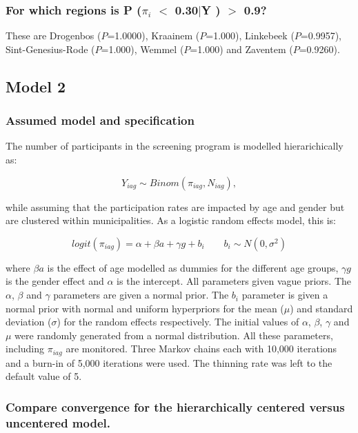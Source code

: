 \documentclass[12pt]{article}
\begin{document}
\subsubsection{For which regions is P ($\pi_i$ $<$ 0.30$|$Y ) $>$ 0.9?}

These are Drogenbos ($P$=1.0000), Kraainem ($P$=1.000), Linkebeek ($P$=0.9957), Sint-Genesius-Rode ($P$=1.000), Wemmel ($P$=1.000) and Zaventem ($P$=0.9260).

\newpage

\subsection{Model 2}

\subsubsection{Assumed model and specification}

The number of participants in the screening program is modelled hierarichically as:

\[
    Y_{iag} \sim Binom(\pi_{iag}, N_{iag}),
\]

while assuming that the participation rates are impacted by age and gender but are clustered within municipalities. As a logistic random effects model, this is: 

\[
    logit(\pi_{iag}) = \alpha + \beta a + \gamma g + b_i \qquad b_i \sim N(0, \sigma^2)
\]

\noindent where $\beta a$ is the effect of age modelled as dummies for the different age groups, $\gamma g$ is the gender effect and $\alpha$ is the intercept. All parameters given vague priors. The $\alpha$, $\beta$ and $\gamma$ parameters are given a normal prior. The $b_i$ parameter is given a normal prior with normal and uniform hyperpriors for the mean ($\mu$) and standard deviation ($\sigma$) for the random effects respectively. The initial values of $\alpha$, $\beta$, $\gamma$ and $\mu$ were randomly generated from a normal distribution. All these parameters, including $\pi_{iag}$ are monitored. Three Markov chains each with 10,000 iterations and a burn-in of 5,000 iterations were used. The thinning rate was left to the default value of 5. 


\subsubsection{ Compare convergence for the hierarchically centered versus uncentered model.}
\end{document}
